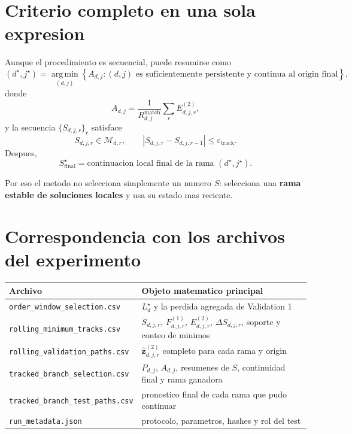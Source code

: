 \documentclass[11pt]{article}
\newcommand{\argmin}{\operatorname*{arg\,min}}
\begin{document}
\section{Criterio completo en una sola expresion}

Aunque el procedimiento es secuencial, puede resumirse como
\begin{equation}
(d^\star,j^\star)
=
\argmin_{(d,j)}
\left\{
A_{d,j}:
(d,j)\text{ es suficientemente persistente y continua al origin final}
\right\},
\label{eq:concept}
\end{equation}
donde
\[
A_{d,j}
=
\frac{1}{R^{\mathrm{match}}_{d,j}}
\sum_r E^{(2)}_{d,j,r},
\]
y la secuencia \(\{S_{d,j,r}\}_r\) satisface
\[
S_{d,j,r}\in\mathcal{M}_{d,r},
\qquad
|S_{d,j,r}-S_{d,j,r-1}|
\le
\varepsilon_{\mathrm{track}}.
\]
Despues,
\[
S_{\mathrm{final}}^\star
=
\text{continuacion local final de la rama }(d^\star,j^\star).
\]

Por eso el metodo no selecciona simplemente un numero \(S\): selecciona una
\textbf{rama estable de soluciones locales} y usa su estado mas reciente.

\section{Correspondencia con los archivos del experimento}

\begin{center}
\begin{tabular}{p{} p{}}
\toprule
Archivo & Objeto matematico principal\\
\midrule
\texttt{order\_window\_selection.csv}
&
\(L_d^\star\) y la perdida agregada de Validation 1
\\
\texttt{rolling\_minimum\_tracks.csv}
&
\(S_{d,j,r}\), \(F^{(1)}_{d,j,r}\), \(E^{(2)}_{d,j,r}\),
\(\Delta S_{d,j,r}\), soporte y conteo de minimos
\\
\texttt{rolling\_validation\_paths.csv}
&
\(\widehat{\bm z}^{(2)}_{d,j,r}\) completo para cada rama y origin
\\
\texttt{tracked\_branch\_selection.csv}
&
\(P_{d,j}\), \(A_{d,j}\), resumenes de \(S\), continuidad final y rama ganadora
\\
\texttt{tracked\_branch\_test\_paths.csv}
&
pronostico final de cada rama que pudo continuar
\\
\texttt{run\_metadata.json}
&
protocolo, parametros, hashes y rol del test
\\
\bottomrule
\end{tabular}
\end{center}
\end{document}
